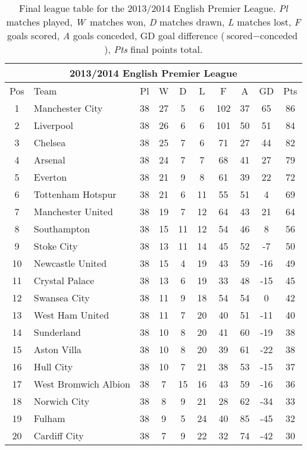 \documentclass[11pt,a4paper]{article}
\begin{document}
\begin{table}[t]
\caption{Final league table for the 2013/2014 English Premier League. \emph{Pl} matches played, \emph{W}~matches won, \emph{D} matches drawn, \emph{L} matches lost, \emph{F} goals scored, \emph{A} goals conceded, {GD} goal difference ($\textrm{scored}-\textrm{conceded}$), \emph{Pts} final points total.} \label{finaltable}
\centering
\begin{tabular}{clcccccccc}
\hline
\multicolumn{10}{c}{2013/2014 English Premier League} \\
\hline 
Pos & Team & Pl &	W &	D &	L &	F &	A &	GD &	Pts \\
1 &	Manchester City & 	38 &	27 &	5 &	6 &	102 &	37 &	65 &	86 \\
2 &	Liverpool &	38 &	26 &	6 &	6 &	101 &	50 &	51 &	84 \\
3 &	Chelsea &	38 &	25 &	7 &	6 &	71 &	27 & 44 &	82 \\
4 &	Arsenal &	38 &	24 &	7 &	7 &	68 &	41 &	27 &	79 \\
\hline
5 &	Everton &	38 &	21 &	9 &	8 &	61 &	39 &	22 &	72\\
6 &	Tottenham Hotspur &	38 &	21 &	6 &	11 &	55 &	51 	& 4 &	69 \\
\hline
7 &	Manchester United &	38 &	19 &	7 &	12 &	64 &	43 &	21 &	64\\
8 &	Southampton &	38 &	15 &	11 &	12 &	54 &	46 &	8 &	56\\
9 &	Stoke City &	38 &	13 &	11 &	14 &	45 &	52 &	-7 &	50\\
10 &	Newcastle United &	38 &	15 &	4 &	19 &	43 &	59 &	-16 &	49\\
11 &	Crystal Palace &	38 	&13 &	6 &	19 &	33 &	48 &	-15 &	45\\
12 &	Swansea City &	38 &	11 &	9 &	18 &	54 &	54 &	0 &	42\\
13 &	West Ham United &	38 &	11 &	7 &	20 &	40 &	51 &	-11 &	40\\
14 &	Sunderland &	38 &	10 &	8 &	20 &	41 &	60 &	-19 &	38\\
15 &	Aston Villa &	38 &	10 &	8 &	20 &	39 &	61 &	-22 &	38\\
16 &	Hull City &	38 &	10 &	7 &	21 &	38 &	53 &	-15 &	37\\
17 &	West Bromwich Albion &	38 &	7 &	15 &	16 &	43 &	59 &	-16 &	36\\
\hline
18 &	Norwich City &	38 &	8 &	9 &	21 &	28 &	62 &	-34 &	33\\
19 &	Fulham &	38 &	9 &	5 &	24 &	40 &	85 &	-45 &	32\\
20 &	Cardiff City &	38 &	7 &	9 &	22 &	32 &	74 &	-42 &	30\\
\hline
\end{tabular}
\end{table} 
\end{document}
